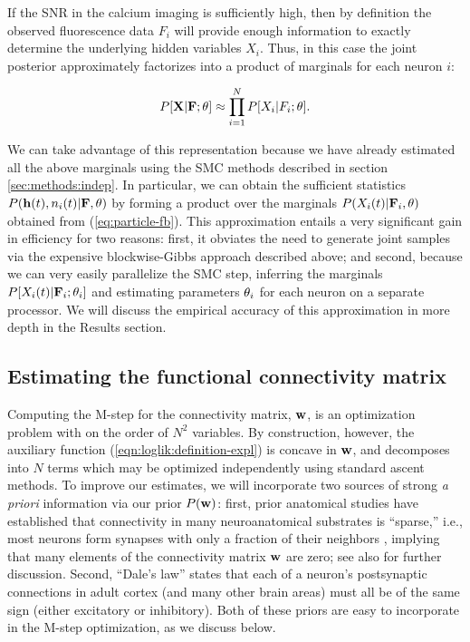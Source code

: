 If the SNR in the calcium imaging is sufficiently high, then by definition the observed fluorescence data $F_i$ will provide enough information to exactly determine the underlying hidden variables $X_i$. Thus, in this case the joint posterior approximately factorizes into a product of marginals for each neuron $i$:

\begin{equation} \label{eqn:indep_approx}
  P[{\bf X}|{\bf F};\theta] \approx \prod_{i=1}^N P[X_i|F_i; \bth].
\end{equation}

We can take advantage of this representation because we have already estimated all the above marginals using the SMC methods described in section \ref{sec:methods:indep}. In particular, we can obtain the sufficient statistics $P(\mathbf{h}(t),n_i(t) | {\bf F},\theta)$ by forming a product over the marginals $P(X_i(t) | {\bf F}_i,\theta)$ obtained from (\ref{eq:particle-fb}). This approximation entails a very significant gain in efficiency for two reasons: first, it obviates the need to generate joint samples via the expensive blockwise-Gibbs approach described above; and second, because we can very easily parallelize the SMC step, inferring the marginals $P[X_i(t) | {\bf F}_i; \mathbf{\theta}_i]$ and estimating parameters $\mathbf{\theta}_i$ for each neuron on a separate processor. We will discuss the empirical accuracy of this approximation in more depth in the Results section.


\subsection{Estimating the functional connectivity matrix} \label{sec:methods:parameters HMM}

Computing the M-step for the connectivity matrix, $\mathbf{w}$, is an
optimization problem with on the order of $N^2$ variables.  By
construction, however, the auxiliary function
(\ref{eqn:loglik:definition-expl}) is concave in $\mathbf{w}$, and decomposes
into $N$ terms which may be optimized independently using standard
ascent methods.  To improve our estimates, we will incorporate two
sources of strong \emph{a priori} information via our prior $P(\mathbf{w})$:
first, prior anatomical studies have established that connectivity in
many neuroanatomical substrates is ``sparse,'' i.e., most neurons form
synapses with only a fraction of their neighbors
\cite{Buhl94,Thompson88,Reyes98,Feldmeyer99,Gupta00,FeldmeyerSakmann00,PetersenSakmann00,Binzegger04,Song2005,Mishchenko2009b},
implying that many elements of the connectivity matrix $\mathbf{w}$ are zero;
see also \cite{PAN04c,Rigat06,PILL07,Stevenson08} for further
discussion.  Second, ``Dale's law'' states that each of a neuron's
postsynaptic connections in adult cortex (and many other brain areas)
must all be of the same sign (either excitatory or inhibitory).  Both
of these priors are easy to incorporate in the M-step optimization, as
we discuss below.


